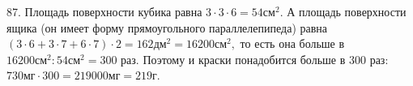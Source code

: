 87. Площадь поверхности кубика равна $3\cdot3\cdot6=54\text{см}^2.$ А площадь поверхности ящика (он имеет форму прямоугольного параллелепипеда) равна $(3\cdot6+3\cdot7+6\cdot7)\cdot2=162\text{дм}^2=16200\text{см}^2,$ то есть она больше в $16200\text{см}^2:54\text{см}^2=300$ раз. Поэтому и краски понадобится больше в 300 раз: $730\text{мг}\cdot300=219000\text{мг}=219$г.\\
